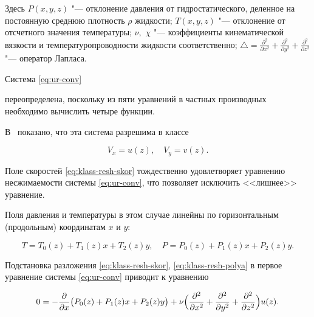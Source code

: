 Здесь $P(x,y,z)$ "--- отклонение давления от гидростатического, деленное на постоянную среднюю плотность $\rho$ жидкости; $T(x,y,z)$ "--- отклонение от отсчетного значения температуры; $\nu,$ $\chi$ "--- коэффициенты кинематической вязкости и температуропроводности жидкости соответственно; $\triangle= \frac{\partial^2}{\partial x^2}+\frac{\partial^2}{\partial y^2}+\frac{\partial^2}{\partial z^2}$ "--- оператор Лапласа.



Система \eqref{eq:ur-conv}


переопределена, поскольку из пяти уравнений в частных производных необходимо вычислить четыре функции. 

В~\cite{Arist2006, Burm_Pros_Samara, Burm_Pros_IOP, Burm_Pros_DREAM, Burm_Pros_AIP, Gorsh_Pros1, Gorsh_Pros2} показано, что эта система разрешима в классе

\begin{equation}\label{eq:klass-resh-skor}

V_x=u(z), \quad V_y=v(z).

\end{equation}

Поле скоростей \eqref{eq:klass-resh-skor} тождественно удовлетворяет уравнению несжимаемости системы \eqref{eq:ur-conv}, что позволяет исключить <<лишнее>> уравнение.



Поля давления и температуры в этом случае линейны по горизонтальным (продольным) координатам $x$ и $y$:

\begin{equation}\label{eq:klass-resh-polya}

T=T_0(z)+T_1(z)x+T_2(z)y,\quad P=P_0(z)+P_1(z)x+P_2(z)y.

\end{equation}



Подстановка разложения \eqref{eq:klass-resh-skor},  \eqref{eq:klass-resh-polya} в первое уравнение системы \eqref{eq:ur-conv} приводит к уравнению

$$\displaystyle

0=-\frac{\partial}{\partial x}

\bigl(P_0(z)+P_1(z)x+P_2(z)y \bigr)+\nu 

\Bigl(\frac{\partial^2}{\partial x^2}+\frac{\partial^2}{\partial y^2}+\frac{\partial^2}{\partial z^2}\Bigr) u(z).$$

